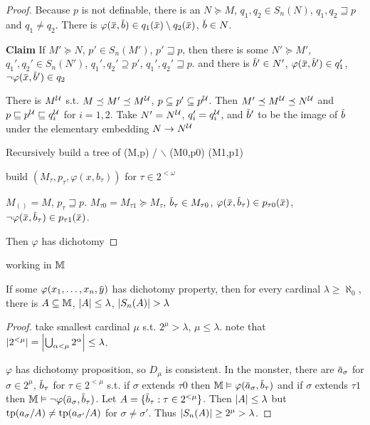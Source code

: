 \documentclass[11pt]{article}
\begin{document}
\begin{proof}
Because \(p\) is not definable, there is an \(N\succeq M\), \(q_1,q_2\in S_n(N)\),  \(q_1,q_2\sqsupseteq p\)  and \(q_1\neq q_2\). There
is \(\varphi(\barx,\barb)\in q_1(\barx)\setminus q_2(\barx)\), \(\barb\in N\).

\textbf{Claim} If \(M'\succeq N\), \(p'\in S_n(M')\), \(p'\sqsupseteq p\), then there is
some \(N'\succeq M'\), \(q_1',q_2'\in S_n(N')\), \(q_1',q_2'\supseteq p'\), \(q_1',q_2'\sqsupseteq p\). and there
is \(\barb'\in N'\), \(\varphi(\barx,\barb')\in q_1'\), \(\neg\varphi(\barx,\barb')\in q_2\)

There is \(M^{\mathcal{U}}\) s.t. \(M\preceq M'\preceq M^{\mathcal{U}}\), \(p\subseteq p'\subseteq p^{\mathcal{U}}\). Then \(M'\preceq M^{\mathcal{U}}\preceq N^{\mathcal{U}}\)
and \(p\sqsubseteq p^{\mathcal{U}}\sqsubseteq q_i^{\mathcal{U}}\) for \(i=1,2\). Take \(N'=N^{\mathcal{U}}\), \(q_i'=q_i^{\mathcal{U}}\), and \(\barb'\) to be
the image of \(\barb\) under the elementary embedding \(N\to N^{\mathcal{U}}\)

  Recursively build a tree of
            (M,p)
            /         $\backslash$
(M0,p0)   (M1,p1)


build \((M_\tau,p_\tau,\varphi(x,b_\tau))\) for \(\tau\in 2^{<\omega}\)

\(M_{()}=M\),
\(p_\tau\sqsupseteq p\).
\(M_{\tau 0}=M_{\tau 1}\succeq M_\tau\),
\(\barb_\tau\in M_{\tau 0}\),
\(\varphi(\barx,\barb_\tau)\in p_{\tau 0}(\barx)\), \(\neg\varphi(\barx,\barb_\tau)\in p_{\tau 1}(\barx)\).

Then \(\varphi\) has dichotomy
\end{proof}


working in \(\mathbb{M}\)
\begin{proposition}[]
If some \(\varphi(x_1,\dots,x_n,\bary)\) has dichotomy property, then for every cardinal \(\lambda\ge\aleph_0\), there
is \(A\subseteq\mathbb{M}\), \(\abs{A}\le\lambda\), \(\abs{S_n(A)}>\lambda\)
\end{proposition}

\begin{proof}
take smallest cardinal \(\mu\) s.t. \(2^\mu>\lambda\), \(\mu\le\lambda\). note that \(\abs{2^{<\mu}}=\abs{\bigcup_{\alpha<\mu}2^\alpha}\le\lambda\).

\(\varphi\) has dichotomy proposition, so \(D_\mu\) is consistent.
In the monster, there are \(\bara_\sigma\) for \(\sigma\in 2^\mu\), \(\barb_\tau\) for \(\tau\in 2^{<\mu}\) s.t.
if \(\sigma\) extends \(\tau0\) then \(\M\vDash\varphi(\bara_\sigma,\barb_\tau)\) and if \(\sigma\) extends \(\tau1\)
then \(\M\vDash\neg\varphi(\bara_\sigma,\barb_\tau)\).
Let \(A=\{\barb_\tau:\tau\in 2^{<\mu}\}\). Then \(\abs{A}\le\lambda\) but \(\operatorname{tp}(a_\sigma/A)\neq\operatorname{tp}(a_{\sigma'}/A)\) for \(\sigma\neq\sigma'\).
Thus \(\abs{S_n(A)}\ge 2^\mu>\lambda\).
\end{proof}
\end{document}
